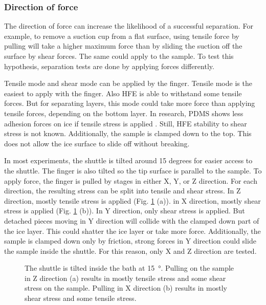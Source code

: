 \subsubsection{Direction of force}

The direction of force can increase the likelihood of a successful separation. For example, to remove a suction cup from a flat surface, using tensile force by pulling will take a higher maximum force than by sliding the suction off the surface by shear forces. The same could apply to the sample. To test this hypothesis, separation tests are done by applying forces differently.

Tensile mode and shear mode can be applied by the finger. Tensile mode is the easiest to apply with the finger. Also HFE is able to withstand some tensile forces. But for separating layers, this mode could take more force than applying tensile forces, depending on the bottom layer. In research, PDMS shows less adhesion forces on ice if tensile stress is applied \cite{IbanezIbanez.2022}. Still, HFE stability to shear stress is not known. Additionally, the sample is clamped down to the top. This does not allow the ice surface to slide off without breaking.

In most experiments, the shuttle is tilted around 15 degrees for easier access to the shuttle. The finger is also tilted so the tip surface is parallel to the sample. To apply force, the finger is pulled by stages in either X, Y, or Z direction. For each direction, the resulting stress can be split into tensile and shear stress. In Z direction, mostly tensile stress is applied (Fig. \ref{fig:tensilevsshear} (a)). in X direction, mostly shear stress is applied (Fig. \ref{fig:tensilevsshear} (b)). In Y direction, only shear stress is applied. But detached pieces moving in Y direction will collide with the clamped down part of the ice layer. This could shatter the ice layer or take more force. Additionally, the sample is clamped down only by friction, strong forces in Y direction could slide the sample inside the shuttle. For this reason, only X and Z direction are tested.

\begin{figure}[hbt!]
	\centering
	
	\caption{The shuttle is tilted inside the bath at \SI{15}{\degree}. Pulling on the sample in Z direction (a) results in mostly tensile stress and some shear stress on the sample. Pulling in X direction (b) results in mostly shear stress and some tensile stress.}
	\label{fig:tensilevsshear}
\end{figure}

